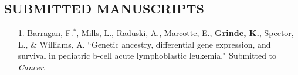 \documentclass[margin]{res}
\begin{document}
\begin{resume}
\section{SUBMITTED MANUSCRIPTS}
\begin{itemize}
\item[1.] Barragan, F.$^*$, Mills, L., Raduski, A., Marcotte, E., \textbf{Grinde, K.}, Spector, L., \& Williams, A. ``Genetic ancestry, differential gene expression, and survival in pediatric b-cell acute lymphoblastic leukemia." Submitted to \textit{Cancer}.\\


\end{itemize}


\end{resume}
\end{document}
